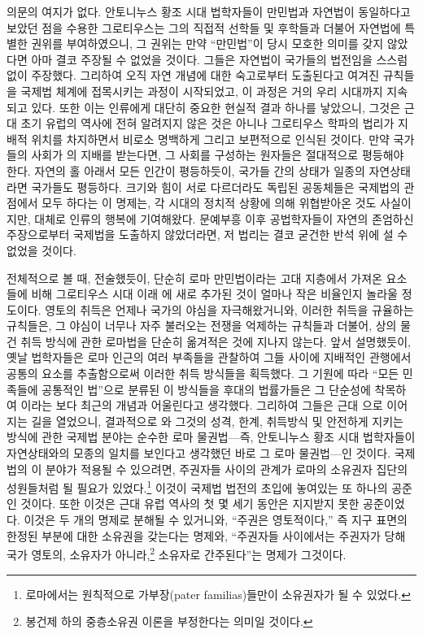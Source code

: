 의문의 여지가 없다.
안토니누스 황조 시대 법학자들이 만민법과 자연법이 동일하다고 보았던 점을
수용한
그로티우스는 그의 직접적 선학들 및 후학들과 더불어
자연법에 특별한 권위를 부여하였으니,
그 권위는 만약 ``만민법''이 당시 모호한 의미를 갖지 않았다면
아마 결코 주장될 수 없었을 것이다.
그들은 자연법이 국가들의 법전임을 스스럼없이 주장했다.
그리하여
오직 자연 개념에 대한 숙고로부터 도출된다고 여겨진 규칙들을
국제법 체계에 접목시키는 과정이 시작되었고,
이 과정은 거의 우리 시대까지 지속되고 있다.
또한 이는 인류에게 대단히 중요한 현실적 결과 하나를 낳았으니,
그것은 근대 초기 유럽의 역사에 전혀 알려지지 않은 것은 아니나
그로티우스 학파의 법리가 지배적 위치를 차지하면서 비로소
명백하게 그리고 보편적으로 인식된 것이다.
만약 국가들의 사회가 의 지배를 받는다면,
그 사회를 구성하는 원자들은 절대적으로 평등해야 한다.
자연의 홀 아래서 모든 인간이 평등하듯이,
국가들 간의 상태가 일종의 자연상태라면 국가들도 평등하다.
크기와 힘이 서로 다르더라도 독립된 공동체들은
국제법의 관점에서 모두 하다는 이 명제는,
각 시대의 정치적 상황에 의해 위협받아온 것도 사실이지만,
대체로 인류의 행복에 기여해왔다.
문예부흥 이후 공법학자들이
자연의 존엄하신 주장으로부터 국제법을 도출하지 않았더라면,
저 법리는 결코 굳건한 반석 위에 설 수 없었을 것이다.

전체적으로 볼 때, 전술했듯이,
단순히 로마 만민법이라는 고대 지층에서 가져온 요소들에 비해
그로티우스 시대 이래 에 새로 추가된 것이
얼마나 작은 비율인지 놀라울 정도이다.
영토의 취득은 언제나 국가의 야심을 자극해왔거니와,
이러한 취득을 규율하는 규칙들은,
그 야심이 너무나 자주 불러오는 전쟁을 억제하는 규칙들과 더불어,
상의 물건 취득 방식에 관한 로마법을
단순히 옮겨적은 것에 지나지 않는다.
앞서 설명했듯이,
옛날 법학자들은
로마 인근의 여러 부족들을 관찰하여 그들 사이에 지배적인 관행에서
공통의 요소를 추출함으로써
이러한 취득 방식들을
획득했다.
그 기원에 따라
``모든 민족들에 공통적인 법''으로 분류된 이 방식들을
후대의 법률가들은
그 단순성에 착목하여 이라는 보다 최근의 개념과 어울린다고 생각했다.
그리하여 그들은 근대 으로 이어지는
길을 열었으니, 결과적으로
와 그것의 성격, 한계, 취득방식 및
안전하게 지키는 방식에 관한 국제법 분야는
순수한 로마 물권법---즉,
안토니누스 황조 시대 법학자들이 자연상태와의 모종의 일치를 보인다고
생각했던 바로 그 로마 물권법---인 것이다.
국제법의 이 분야가 적용될 수 있으려면,
주권자들 사이의 관계가
로마의 소유권자 집단의 성원들처럼 될 필요가
있었다.\footnote{%
  로마에서는 원칙적으로 가부장(pater familias)들만이 소유권자가 될 수 있었다. }
이것이 국제법 법전의 초입에 놓여있는 또 하나의 공준인 것이다.
또한 이것은 근대 유럽 역사의 첫 몇 세기 동안은 지지받지 못한 공준이었다.
이것은 두 개의 명제로 분해될 수 있거니와,
``주권은 영토적이다,'' 즉
지구 표면의 한정된 부분에 대한 소유권을 갖는다는 명제와,
``주권자들 사이에서는 주권자가 당해 국가 영토의,
 소유자가 아니라,\footnote{%
  봉건제 하의 중층소유권 이론을 부정한다는 의미일 것이다. }
 소유자로 간주된다''는 명제가
그것이다.


